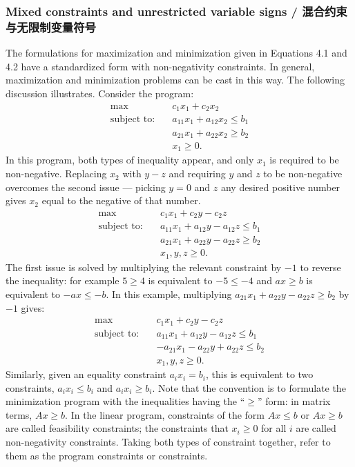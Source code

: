 \subsubsection{Mixed constraints and unrestricted variable signs / 混合约束与无限制变量符号}

\begin{original}
The formulations for maximization and minimization given in Equations 4.1 and 4.2 have a standardized form with non-negativity constraints. In general, maximization and minimization problems can be cast in this way. The following discussion illustrates. Consider the program:
\[
\begin{aligned}
\max \quad & c_1 x_1 + c_2 x_2 \\
\text{subject to:} \quad & a_{11}x_1 + a_{12}x_2 \le b_1 \\
& a_{21}x_1 + a_{22}x_2 \ge b_2 \\
& x_1 \ge 0.
\end{aligned}
\]
In this program, both types of inequality appear, and only $x_1$ is required to be non-negative. Replacing $x_2$ with $y - z$ and requiring $y$ and $z$ to be non-negative overcomes the second issue --- picking $y = 0$ and $z$ any desired positive number gives $x_2$ equal to the negative of that number.
\[
\begin{aligned}
\max \quad & c_1 x_1 + c_2 y - c_2 z \\
\text{subject to:} \quad & a_{11}x_1 + a_{12}y - a_{12}z \le b_1 \\
& a_{21}x_1 + a_{22}y - a_{22}z \ge b_2 \\
& x_1, y, z \ge 0.
\end{aligned}
\]
The first issue is solved by multiplying the relevant constraint by $-1$ to reverse the inequality: for example $5 \ge 4$ is equivalent to $-5 \le -4$ and $ax \ge b$ is equivalent to $-ax \le -b$. In this example, multiplying $a_{21}x_1 + a_{22}y - a_{22}z \ge b_2$ by $-1$ gives:
\[
\begin{aligned}
\max \quad & c_1 x_1 + c_2 y - c_2 z \\
\text{subject to:} \quad & a_{11}x_1 + a_{12}y - a_{12}z \le b_1 \\
& -a_{21}x_1 - a_{22}y + a_{22}z \le b_2 \\
& x_1, y, z \ge 0.
\end{aligned}
\]
Similarly, given an equality constraint $a_i x_i = b_i$, this is equivalent to two constraints, $a_i x_i \le b_i$ and $a_i x_i \ge b_i$. Note that the convention is to formulate the minimization program with the inequalities having the ``$\ge$'' form: in matrix terms, $Ax \ge b$. In the linear program, constraints of the form $Ax \le b$ or $Ax \ge b$ are called feasibility constraints; the constraints that $x_i \ge 0$ for all $i$ are called non-negativity constraints. Taking both types of constraint together, refer to them as the program constraints or constraints.
\end{original}
